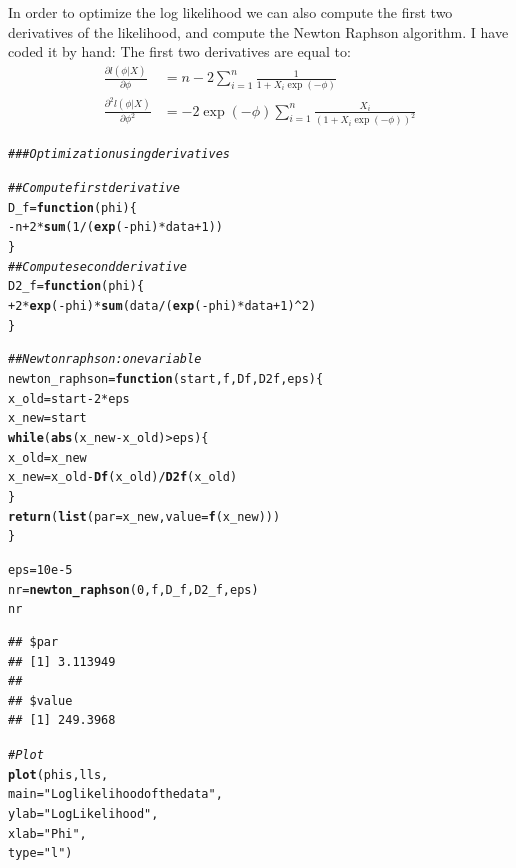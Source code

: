 \documentclass[11pt]{article}\usepackage[]{graphicx}\usepackage[]{color}
\makeatletter
\newcommand{\hlnum}[1]{\textcolor[rgb]{0.686,0.059,0.569}{#1}}%
\newcommand{\hlstr}[1]{\textcolor[rgb]{0.192,0.494,0.8}{#1}}%
\newcommand{\hlcom}[1]{\textcolor[rgb]{0.678,0.584,0.686}{\textit{#1}}}%
\newcommand{\hlopt}[1]{\textcolor[rgb]{0,0,0}{#1}}%
\newcommand{\hlstd}[1]{\textcolor[rgb]{0.345,0.345,0.345}{#1}}%
\newcommand{\hlkwa}[1]{\textcolor[rgb]{0.161,0.373,0.58}{\textbf{#1}}}%
\newcommand{\hlkwb}[1]{\textcolor[rgb]{0.69,0.353,0.396}{#1}}%
\newcommand{\hlkwc}[1]{\textcolor[rgb]{0.333,0.667,0.333}{#1}}%
\newcommand{\hlkwd}[1]{\textcolor[rgb]{0.737,0.353,0.396}{\textbf{#1}}}%
\newenvironment{kframe}{%
 \def\at@end@of@kframe{}%
 \ifinner\ifhmode%
  \def\at@end@of@kframe{\end{minipage}}%
  \begin{minipage}{\columnwidth}%
 \fi\fi%
 \def\FrameCommand##1{\hskip\@totalleftmargin \hskip-\fboxsep
 \colorbox{shadecolor}{##1}\hskip-\fboxsep
     \hskip-\linewidth \hskip-\@totalleftmargin \hskip\columnwidth}%
 \MakeFramed {\advance\hsize-\width
   \@totalleftmargin\z@ \linewidth\hsize
   \@setminipage}}%
 {\par\unskip\endMakeFramed%
 \at@end@of@kframe}
\newenvironment{knitrout}{}{} %
\makeatother
\begin{document}
\section{}
In order to optimize the log likelihood we can also compute the first two derivatives of the likelihood, and compute the Newton Raphson algorithm. I have coded it by hand:
The first two derivatives are equal to:
\begin{align}
\frac{\partial l(\phi|X)}{\partial \phi} &= n  - 2\sum_{i=1}^n \frac{1}{1+X_i\exp(-\phi)}\\
\frac{\partial^2 l(\phi|X)}{\partial \phi^2} &= -2\exp(-\phi)\sum_{i=1}^n \frac{X_i}{(1+X_i\exp(-\phi))^2}
\end{align}
\begin{knitrout}
\color{fgcolor}\begin{kframe}
\begin{alltt}
\hlcom{## # Optimization using derivatives}

\hlcom{# # Compute first derivative}
\hlstd{D_f} \hlkwb{=} \hlkwa{function}\hlstd{(}\hlkwc{phi}\hlstd{)\{}
  \hlopt{-}\hlstd{n} \hlopt{+} \hlnum{2}\hlopt{*}\hlkwd{sum}\hlstd{(}\hlnum{1}\hlopt{/}\hlstd{(}\hlkwd{exp}\hlstd{(}\hlopt{-}\hlstd{phi)}\hlopt{*}\hlstd{data}\hlopt{+}\hlnum{1}\hlstd{))}
\hlstd{\}}
\hlcom{# # Compute second derivative}
\hlstd{D2_f} \hlkwb{=} \hlkwa{function}\hlstd{(}\hlkwc{phi}\hlstd{)\{}
  \hlopt{+} \hlnum{2}\hlopt{*}\hlkwd{exp}\hlstd{(}\hlopt{-}\hlstd{phi)}\hlopt{*}\hlkwd{sum}\hlstd{(data}\hlopt{/}\hlstd{(}\hlkwd{exp}\hlstd{(}\hlopt{-}\hlstd{phi)}\hlopt{*}\hlstd{data}\hlopt{+}\hlnum{1}\hlstd{)}\hlopt{^}\hlnum{2}\hlstd{)}
\hlstd{\}}

\hlcom{# # Newton raphson: one variable}
\hlstd{newton_raphson} \hlkwb{=} \hlkwa{function}\hlstd{(}\hlkwc{start}\hlstd{,}\hlkwc{f}\hlstd{,}\hlkwc{Df}\hlstd{,}\hlkwc{D2f}\hlstd{,}\hlkwc{eps}\hlstd{)\{}
  \hlstd{x_old}\hlkwb{=}\hlstd{start}\hlopt{-}\hlnum{2}\hlopt{*}\hlstd{eps}
  \hlstd{x_new}\hlkwb{=}\hlstd{start}
  \hlkwa{while} \hlstd{(}\hlkwd{abs}\hlstd{(x_new}\hlopt{-}\hlstd{x_old)}\hlopt{>}\hlstd{eps)\{}
    \hlstd{x_old} \hlkwb{=} \hlstd{x_new}
    \hlstd{x_new} \hlkwb{=} \hlstd{x_old} \hlopt{-} \hlkwd{Df}\hlstd{(x_old)}\hlopt{/}\hlkwd{D2f}\hlstd{(x_old)}
  \hlstd{\}}
  \hlkwd{return}\hlstd{(}\hlkwd{list}\hlstd{(}\hlkwc{par} \hlstd{= x_new,} \hlkwc{value} \hlstd{=} \hlkwd{f}\hlstd{(x_new)))}
\hlstd{\}}

\hlstd{eps}\hlkwb{=}\hlnum{10e-5}
\hlstd{nr} \hlkwb{=} \hlkwd{newton_raphson}\hlstd{(}\hlnum{0}\hlstd{,f,D_f,D2_f,eps)}
\hlstd{nr}
\end{alltt}
\begin{verbatim}
## $par
## [1] 3.113949
## 
## $value
## [1] 249.3968
\end{verbatim}
\begin{alltt}
\hlcom{# Plot}
\hlkwd{plot}\hlstd{(phis,lls,}
     \hlkwc{main} \hlstd{=} \hlstr{"Log likelihood of the data"}\hlstd{,}
     \hlkwc{ylab} \hlstd{=} \hlstr{"Log Likelihood"}\hlstd{,}
     \hlkwc{xlab} \hlstd{=} \hlstr{"Phi"}\hlstd{,}
     \hlkwc{type}\hlstd{=}\hlstr{"l"}\hlstd{)}


\end{alltt}
\end{kframe}
\end{knitrout}
\end{document}
